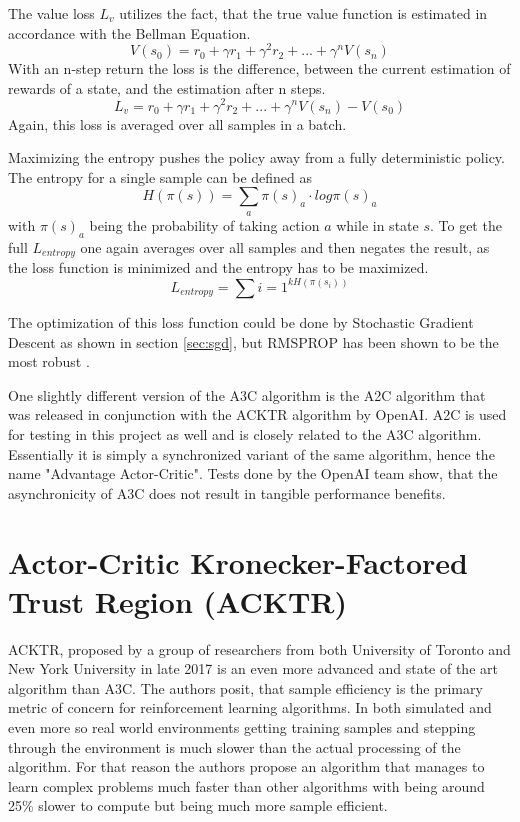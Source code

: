 The value loss $L_v$ utilizes the fact, that the true value function is estimated in accordance with the Bellman Equation. 
$$V(s_0) = r_0 + \gamma r_1 + \gamma^2 r_2 + ... + \gamma^n V(s_n)$$
With an n-step return the loss is the difference, between the current estimation of rewards of a state, and the estimation after n steps.
$$L_v = r_0 + \gamma r_1 + \gamma^2 r_2 + ... + \gamma^n V(s_n) - V(s_0)$$
Again, this loss is averaged over all samples in a batch.

Maximizing the entropy pushes the policy away from a fully deterministic policy. The entropy for a single sample can be defined as
$$H(\pi(s)) = \sum\limits_{a} \pi(s)_a \cdot log \pi(s)_a$$
with $\pi(s)_a$ being the probability of taking action $a$ while in state $s$.
To get the  full $L_{entropy}$ one again averages over all samples and then negates the result, as the loss function is minimized and the entropy has to be maximized.
$$L_{entropy} = \sum\limits{i=1}^{k H(\pi(s_i))}$$

The optimization of this loss function could be done by Stochastic Gradient Descent as shown in section \ref{sec:sgd}, but RMSPROP \citep{rmsprop} has been shown to be the most robust \citep{DBLP:journals/corr/a3c}.

One slightly different version of the A3C algorithm is the A2C algorithm that was released in conjunction with the ACKTR algorithm by OpenAI\citep{openaiblog-a2c}. A2C is used for testing in this project as well and is closely related to the A3C algorithm. Essentially it is simply a synchronized variant of the same algorithm, hence the name "Advantage Actor-Critic". Tests done by the OpenAI team show, that the asynchronicity of A3C does not result in tangible performance benefits\citep{openaiblog-a2c}.

\section{Actor-Critic Kronecker-Factored Trust Region (ACKTR)}
\label{sec:acktrtheory}
ACKTR, proposed by a group of researchers from both University of Toronto and New York University in late 2017\citep{DBLP:journals/corr/abs-1708-05144} is an even more advanced and state of the art algorithm than A3C. The authors posit, that sample efficiency is the primary metric of concern for reinforcement learning algorithms. In both simulated and even more so real world environments getting training samples and stepping through the environment is much slower than the actual processing of the algorithm. For that reason the authors propose an algorithm that manages to learn complex problems much faster than other algorithms with being around 25\% slower to compute but being much more sample efficient.

